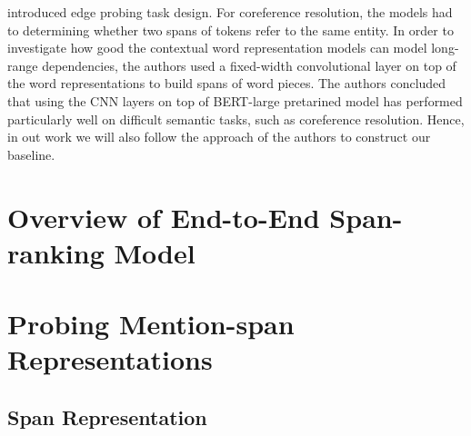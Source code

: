 \documentclass[11pt]{article}
\begin{document}
\textcite{tenney2019context} introduced edge probing task design. For coreference resolution, the models had to determining whether two spans of tokens refer to the same entity. In order to investigate how good the contextual word representation models can model long-range dependencies, the authors used a fixed-width convolutional layer on top of the word representations to build spans of word pieces. The authors concluded that using the CNN layers on top of BERT-large pretarined model has performed particularly well on difficult semantic tasks, such as coreference resolution. Hence, in out work we will also follow the approach of the authors to construct our baseline. 

\section{Overview of End-to-End Span-ranking Model}

\section{Probing Mention-span Representations}


\subsection{Span Representation}
\end{document}
